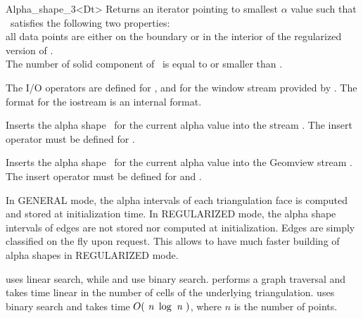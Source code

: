 \begin{ccRefClass} {Alpha_shape_3<Dt>}
{Returns an iterator pointing to smallest $\alpha$ value
such that \ccVar\ satisfies the following two properties:\\
all data points are either on the boundary or in the interior 
of the regularized version of \ccVar. \\
The number of solid component of \ccVar\  is  equal to or
smaller than .}


The I/O operators are defined for , and for
the window stream provided by \cgal. The format for the iostream
is an internal format. 


{Inserts the alpha shape \ccVar\ for the current alpha value into the stream .
\ccPrecond The insert operator must be defined for .}



{Inserts the alpha shape \ccVar\ for the current alpha value into the Geomview stream .
\ccPrecond The insert operator must be defined for  and .}

\ccImplementation

In GENERAL mode, the alpha  intervals of each triangulation
face is computed and stored at initialization time.
In REGULARIZED mode, the alpha shape intervals of edges
are not stored nor computed at initialization.
Edges are simply classified on the fly upon request.
This allows to have much faster building of alpha shapes in
REGULARIZED mode.


 uses linear search, while 
 and  
use binary search.
 performs a graph traversal and takes time
linear in the number of cells of the underlying triangulation.
 uses binary search and takes time
$O(\mbox{ \em n } \log{\mbox{ \em n } })$, where  $n$ is the number of points.

\end{ccRefClass}

